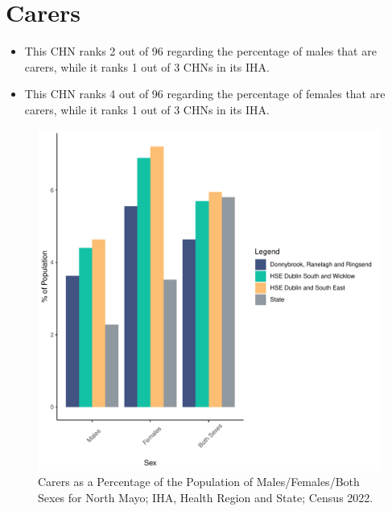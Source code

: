 \documentclass{article}
\begin{document}
\section{Carers}\label{sect:Carers}
\begin{itemize}
\item This CHN ranks  2 out of 96 regarding the percentage of males that are carers, while it ranks   1 out of 3 CHNs in its IHA.
\item This CHN ranks  4 out of 96 regarding the percentage of females that are carers, while it ranks   1 out of 3 CHNs in its IHA.
\end{itemize}
\begin{figure}[H]
	\centering
	\includegraphics[width = 150mm]{../figures/CareED.pdf}
	\caption{Carers as a Percentage of the Population of Males/Females/Both Sexes for North Mayo; IHA, Health Region and State; Census 2022.}
	\label{fig:2ae19629-1a6a-13a3-e055-000000000001}
	\end{figure}
\end{document}
